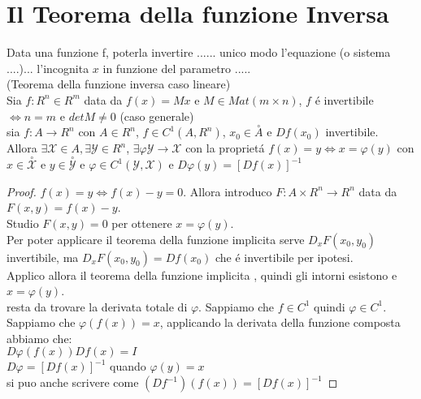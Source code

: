 \section{Il Teorema della funzione Inversa}
Data una funzione f, poterla invertire  ...... unico modo l'equazione (o sistema ....)... l'incognita $x$ in funzione del parametro .....\\
\proposition(Teorema della funzione inversa caso lineare)\\
Sia $f:R^n\in R^m$ data da $f(x)=Mx$ e $M\in Mat(m\times n)$, $f$ \'e invertibile $\Leftrightarrow n=m$ e $detM\ne 0$
\proposition(caso generale)\\
sia $f:A\rightarrow R^n$ con $A\in R^n$, $f\in C^1(A,R^n)$, $x_0\in \overset{\circ}A$ e $Df(x_0)$ invertibile.\\
Allora $\exists\mathcal{X}\in A,\exists\mathcal{Y}\in R^n$, $\exists\varphi\mathcal{Y}\rightarrow\mathcal{X}$ con la propriet\'a $f(x)=y\Leftrightarrow x=\varphi(y)$ con $x\in\overset{\circ}{\mathcal{X}}$ e $y\in\overset{\circ}{\mathcal{Y}}$ e $\varphi\in C^1(\mathcal{Y},\mathcal{X})$ e $D\varphi(y)=[Df(x)]^{-1}$\\
\begin{proof}
	$f(x)=y\Leftrightarrow f(x)-y=0$. Allora introduco $F:A\times R^n\rightarrow R^n$ data da $F(x,y)=f(x)-y$.\\
	Studio $F(x,y)=0$ per ottenere $x=\varphi(y)$.\\
	Per poter applicare il teorema della funzione implicita serve $D_xF(x_0,y_0)$ invertibile, ma $D_xF(x_0,y_0)=Df(x_0)$ che \'e invertibile per ipotesi.\\
	Applico allora il teorema della funzione implicita , quindi gli intorni esistono e $x=\varphi(y)$.\\
	resta da trovare la derivata totale di $\varphi$. Sappiamo che $f\in C^1$ quindi $\varphi \in C^1$.\\
	Sappiamo che $\varphi(f(x))=x$, applicando la derivata della funzione composta abbiamo che:\\
	$D\varphi(f(x))Df(x)=I$\\
	$D\varphi=[Df(x)]^{-1}$ quando $\varphi(y)=x$\\
	si puo anche scrivere come $(Df^{-1})(f(x))=[Df(x)]^{-1}$
\end{proof}
